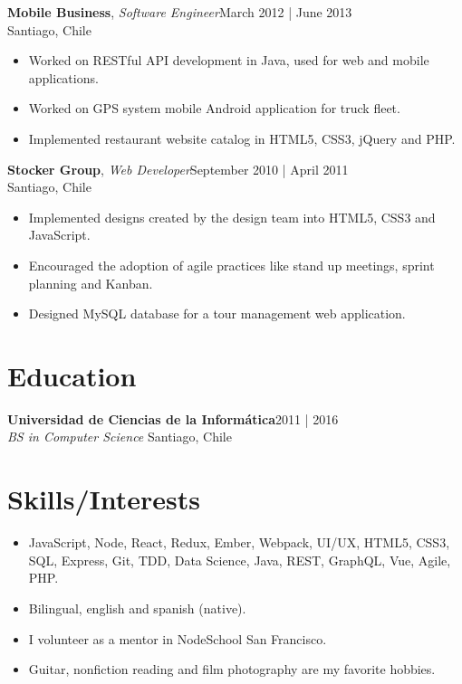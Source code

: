 \documentclass[line,letterpaper, 10pt]{res}
\begin{document}
\begin{resume}
	\textbf{Mobile Business}, {\sl Software Engineer}\hfill March 2012 | June 2013
	\\Santiago, Chile
	\\

	\begin{itemize} \itemsep 3pt
	\item Worked on RESTful API development in Java, used for web and mobile applications.
	\item Worked on GPS system mobile Android application for truck fleet.
	\item Implemented restaurant website catalog in HTML5, CSS3, jQuery and PHP.
	
	\end{itemize}

	\textbf{Stocker Group}, {\sl Web Developer}\hfill September 2010 | April 2011
	\\Santiago, Chile
	\\

	\begin{itemize} \itemsep 3pt
	\item Implemented designs created by the design team into HTML5, CSS3 and JavaScript.
	\item Encouraged the adoption of agile practices like stand up meetings, sprint planning and Kanban.
	\item Designed MySQL database for a tour management web application.
	
	\end{itemize}

	\section{Education}
	\textbf{Universidad de Ciencias de la Informática}\hfill 2011 | 2016
	\\{\sl BS in Computer Science} \hfill Santiago, Chile

	\section{Skills/Interests}
	\begin{itemize}
	\item JavaScript, Node, React, Redux, Ember, Webpack, UI/UX, HTML5, CSS3, SQL, Express, Git, TDD, Data Science, Java, REST, GraphQL, Vue, Agile, PHP.
	\item Bilingual, english and spanish (native).
	\item I volunteer as a mentor in NodeSchool San Francisco.
	\item Guitar, nonfiction reading and film photography are my favorite hobbies.
	\end{itemize}

\end{resume}
\end{document}
